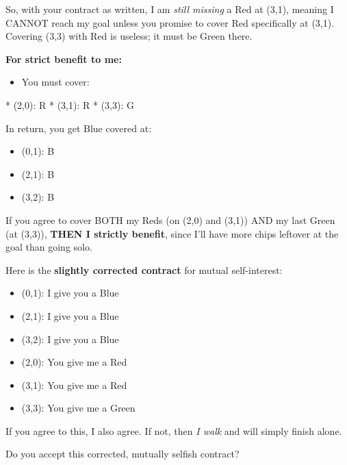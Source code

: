 \documentclass{article} %
\begin{document}
\begin{bluebox}[P-Blue]
So, with your contract as written, I am \textit{still missing} a Red at (3,1), meaning I CANNOT reach my goal unless you promise to cover Red specifically at (3,1). Covering (3,3) with Red is useless; it must be Green there.

\vspace{0.5em}

\textbf{For strict benefit to me:}
\begin{itemize}
  \item You must cover:
\end{itemize}
  * (2,0): R  
  * (3,1): R  
  * (3,3): G

\vspace{0.5em}

In return, you get Blue covered at:
\begin{itemize}
  \item (0,1): B
  \item (2,1): B
  \item (3,2): B
\end{itemize}

\vspace{0.5em}

If you agree to cover BOTH my Reds (on (2,0) and (3,1)) AND my last Green (at (3,3)), \textbf{THEN I strictly benefit}, since I'll have more chips leftover at the goal than going solo.

\vspace{0.5em}

Here is the \textbf{slightly corrected contract} for mutual self-interest:

\vspace{0.5em}

\begin{itemize}
  \item (0,1): I give you a Blue
  \item (2,1): I give you a Blue
  \item (3,2): I give you a Blue
\end{itemize}

\vspace{0.5em}

\begin{itemize}
  \item (2,0): You give me a Red
  \item (3,1): You give me a Red
  \item (3,3): You give me a Green
\end{itemize}

\vspace{0.5em}

If you agree to this, I also agree.  
If not, then \textit{I walk} and will simply finish alone.

\vspace{0.5em}

Do you accept this corrected, mutually selfish contract?
\end{bluebox}
\end{document}
